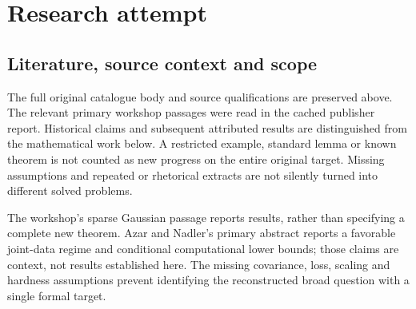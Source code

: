 \documentclass[11pt]{article}
\begin{document}
\section{Research attempt}
\subsection{Literature, source context and scope}
The full original catalogue body and source qualifications are preserved above. The relevant primary workshop passages were read in the cached publisher report. Historical claims and subsequent attributed results are distinguished from the mathematical work below. A restricted example, standard lemma or known theorem is not counted as new progress on the entire original target. Missing assumptions and repeated or rhetorical extracts are not silently turned into different solved problems.

The workshop's sparse Gaussian passage reports results, rather than specifying a complete new theorem. Azar and Nadler's primary abstract reports a favorable joint-data regime and conditional computational lower bounds; those claims are context, not results established here. The missing covariance, loss, scaling and hardness assumptions prevent identifying the reconstructed broad question with a single formal target.
\end{document}
